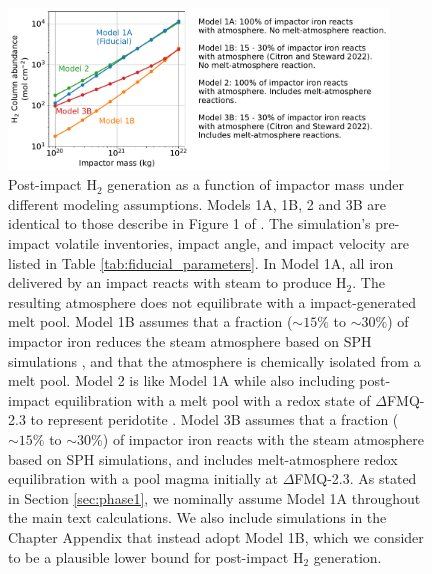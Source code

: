 \begin{figure}
  \centering
  \includegraphics[width=0.9\textwidth]{tex/5impacts/figures/melt_reaction_sup.pdf}
  \caption{Post-impact H$_2$ generation as a function of impactor mass under different modeling assumptions. Models 1A, 1B, 2 and 3B are identical to those describe in Figure 1 of \citet{Itcovitz_2022}. The simulation's pre-impact volatile inventories, impact angle, and impact velocity are listed in Table \ref{tab:fiducial_parameters}. In Model 1A, all iron delivered by an impact reacts with steam to produce H$_2$. The resulting atmosphere does not equilibrate with a impact-generated melt pool. Model 1B assumes that a fraction ($\sim 15\%$ to $\sim 30\%$) of impactor iron reduces the steam atmosphere based on SPH simulations \citep{Citron_2022}, and that the atmosphere is chemically isolated from a melt pool. Model 2 is like Model 1A while also including post-impact equilibration with a melt pool with a redox state of $\Delta$FMQ-2.3 to represent peridotite \citep{Itcovitz_2022}. Model 3B assumes that a fraction ($\sim 15\%$ to $\sim 30\%$) of impactor iron reacts with the steam atmosphere based on SPH simulations, and includes melt-atmosphere redox equilibration with a pool magma initially at $\Delta$FMQ-2.3. As stated in Section \ref{sec:phase1}, we nominally assume Model 1A throughout the main text calculations. We also include simulations in the Chapter Appendix that instead adopt Model 1B, which we consider to be a plausible lower bound for post-impact H$_2$ generation.}
  \label{fig:melt_reaction_sup}
\end{figure}

